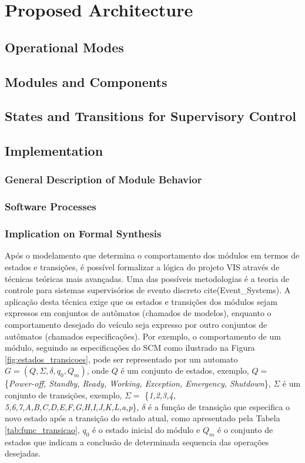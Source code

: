 \documentclass[conference]{IEEEtran}
\begin{document}
\section{Proposed Architecture}\label{sec:proposed_architec}
\subsection{Operational Modes}\label{subsec:operational_modes}
\subsection{Modules and Components}\label{subsec:modules_components}
\subsection{States and Transitions for Supervisory Control}\label{subsec:states_transitions}
\subsection{Implementation}\label{subsec:implementation}
\subsubsection{General Description of Module Behavior}\label{subsec:module_behavior}
\subsubsection{Software Processes}\label{subsec:software_processes}

\subsubsection{Implication on Formal Synthesis}\label{subsec:formal_synthesis}

Após o modelamento que determina o comportamento dos módulos em termos de estados e transições, é possível formalizar a lógica do projeto VIS através de técnicas teóricas mais avançadas. 
Uma das possíveis metodologias é a teoria de controle para sistemas supervisórios de evento discreto cite(Event\_Systems). A aplicação desta técnica exige que os estados e transições dos módulos sejam expressos em conjuntos de autômatos (chamados de modelos), enquanto o comportamento desejado do veículo seja expresso por outro conjuntos de autômatos (chamados especificações). Por exemplo, o comportamento de um módulo, seguindo as especificações do SCM como ilustrado na Figura \ref{fig:estados_transicoes}, pode ser representado por um automato $G = (Q,\Sigma,\delta,q_{0},Q_{m})$, onde $Q$ é um conjunto de estados, exemplo, $Q =$ \{\textit{Power-off, Standby, Ready, Working, Exception, Emergency, Shutdown}\}, $\Sigma$ é um conjunto de transições, exemplo, $\Sigma =$ \{\textit{1,2,3,4, 5,6,7,A,B,C,D,E,F,G,H,I,J,K,L,a,p}\}, $\delta$ é a função de transição que especifica o novo estado após a transição do estado atual, como apresentado pela Tabela \ref{tab:func_transicao}, $q_{0}$ é o estado inicial do módulo e $Q_{m}$ é o conjunto de estados que indicam a conclusão de determinada sequencia das operações desejadas.
\end{document}
